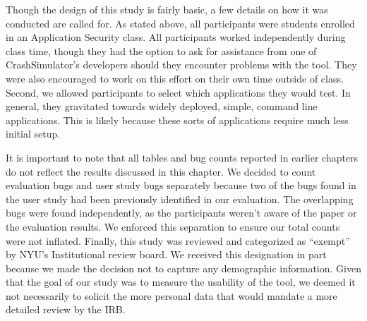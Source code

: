 Though the design of this study is fairly basic, a few details on how it was conducted are called for. As stated above, all participants were students enrolled in an Application Security class.
All participants worked independently during class time, though they had the option to ask for assistance from one of CrashSimulator's developers should they encounter problems with the tool.
They were also encouraged to work on this effort on their own time outside of class.
Second, we allowed participants to select which applications they would test.
In general, they gravitated towards widely deployed, simple, command line applications.
This is likely because these sorts of applications require much less initial setup.

It is important to note that all tables and bug counts reported in earlier
chapters do not reflect the results discussed in this chapter.
We decided to count evaluation bugs and user study bugs separately because two of the bugs found in the user study
had been previously identified
in our evaluation.
The overlapping bugs were found independently,
as the participants weren't aware of the paper or the evaluation results.
We enforced this separation to ensure our total counts were not inflated.
Finally, this study was reviewed and categorized as ``exempt'' by NYU's Institutional review board.
We received this designation in part because we made the decision not to capture any demographic information. Given that the goal of our study was to measure the usability of the tool, we deemed it not necessarily to solicit the more personal data that would mandate a more detailed review by the IRB.

